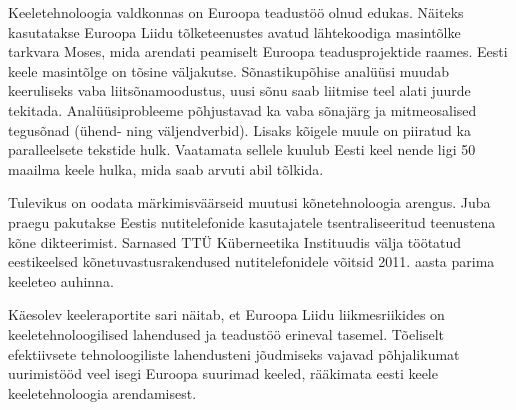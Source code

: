 \documentclass[]{../metanetpaper}
\begin{document}
\begin{multicols}{2}
Keeletehnoloogia valdkonnas on Euroopa teadustöö olnud edukas. 
Näiteks kasutatakse Euroopa Liidu tõlketeenustes avatud lähtekoodiga masintõlke tarkvara Moses, mida arendati peamiselt Euroopa teadusprojektide raames. 
Eesti keele masintõlge on tõsine väljakutse. 
Sõnastikupõhise analüüsi muudab keeruliseks vaba liitsõnamoodustus, uusi sõnu saab liitmise teel alati juurde tekitada. 
Analüüsiprobleeme põhjustavad ka vaba sõnajärg ja mitmeosalised tegusõnad (ühend- ning väljendverbid). 
Lisaks kõigele muule on piiratud ka paralleelsete tekstide hulk. 
Vaatamata sellele kuulub Eesti keel nende ligi 50 maailma keele hulka, mida saab arvuti abil tõlkida.

Tulevikus on oodata märkimisväärseid muutusi kõnetehnoloogia arengus.
Juba praegu pakutakse Eestis nutitelefonide kasutajatele tsentraliseeritud teenustena kõne dikteerimist.
Sarnased TTÜ Küberneetika Instituudis välja töötatud eestikeelsed kõnetuvastusrakendused nutitelefonidele võitsid 2011. aasta parima keeleteo auhinna.



Käesolev keeleraportite sari näitab, et Euroopa Liidu liikmesriikides on keeletehno\-loogilised lahendused ja teadustöö erineval tasemel. 
Tõeliselt efektiivsete tehnoloogiliste lahendusteni jõudmiseks vajavad põhjalikumat uurimistööd veel isegi Euroopa suurimad keeled, rääkimata eesti keele keeletehnoloogia arendamisest. 


\end{multicols}
\end{document}

